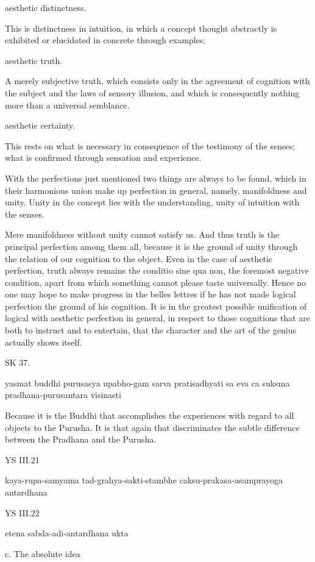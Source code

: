     aesthetic distinctness.

        This is distinctness in intuition,
        in which a concept thought abstractly
        is exhibited or elucidated
        in concrete through examples;

    aesthetic truth.

        A merely subjective truth,
        which consists only in
        the agreement of cognition with the subject
        and the laws of sensory illusion,
        and which is consequently nothing more
        than a universal semblance.

    aesthetic certainty.

        This rests on what is necessary
        in consequence of the testimony of the senses;
        what is confirmed through sensation and experience.

    With the perfections just mentioned
    two things are always to be found,
    which in their harmonious union
    make up perfection in general,
    namely, manifoldness and unity.
    Unity in the concept lies with the understanding,
    unity of intuition with the senses.

    Mere manifoldness without unity cannot satisfy us.
    And thus truth is the principal perfection among them all,
    because it is the ground of unity through
    the relation of our cognition to the object.
    Even in the case of aesthetic perfection,
    truth always remains the conditio sine qua non,
    the foremost negative condition,
    apart from which something cannot please taste universally.
    Hence no one may hope to make progress in the belles lettres
    if he has not made logical perfection the ground of his cognition.
    It is in the greatest possible unification of
    logical with aesthetic perfection in general,
    in respect to those cognitions that are both
    to instruct and to entertain,
    that the character and the art of
    the genius actually shows itself.

SK 37.

yasmat buddhi purusasya upabho-gam sarva pratisadhyati
sa eva ca suksma pradhana-purusantara visinasti

Because it is the Buddhi that accomplishes the experiences
with regard to all objects to the Purusha.
It is that again that discriminates the subtle difference
between the Pradhana and the Purusha.

YS III.21

    kaya-rupa-samyama tad-grahya-sakti-stambhe
    caksu-prakasa-asamprayoga antardhana

YS III.22

    etena sabda-adi-antardhana ukta

    c. The absolute idea
